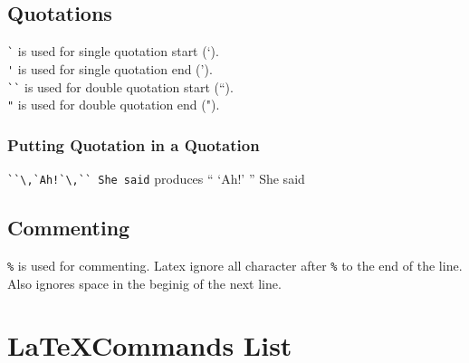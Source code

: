 \documentclass[11pt]{article}
\begin{document}
\subsection{Quotations}

\verb=`= is used for single quotation start (`).\\
\verb='= is used for single quotation end (').\\
\verb=``= is used for double quotation start (``).\\
\verb="= is used for double quotation end (").

\subsubsection{Putting Quotation in a Quotation}

\verb=``\,`Ah!`\,`` She said= produces ``\,\,`Ah!'\,\,'' She said

\subsection{Commenting}

\verb=%= is used for commenting. Latex ignore all character after \verb=%= to the end of the line. Also ignores space in the beginig of the next line.

\section{\LaTeX Commands List}
\end{document}
